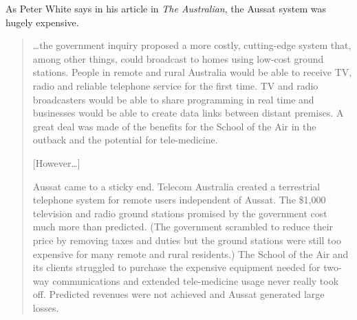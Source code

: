 As Peter White says in his article in \textit{The Australian}, the Aussat system was hugely expensive.

\begin{quotation}
\ldots the government inquiry proposed a more costly, cutting-edge system that, among other things, could broadcast to homes using low-cost ground stations. People in remote and rural Australia would be able to receive TV, radio and reliable telephone service for the first time. TV and radio broadcasters would be able to share programming in real time and businesses would be able to create data links between distant premises. A great deal was made of the benefits for the School of the Air in the outback and the potential for tele-medicine.

[However\ldots]

Aussat came to a sticky end. Telecom Australia created a terrestrial telephone system for remote users independent of Aussat. 
The \$1,000 television and radio ground stations promised by the government cost much more than predicted. (The government scrambled to reduce their price by removing taxes and duties but the ground stations were still too expensive for many remote and rural residents.) The School of the Air and its clients struggled to purchase the expensive equipment needed for two-way communications and extended tele-medicine usage never really took off. Predicted revenues were not achieved and Aussat generated large losses\cite{RefWorks:60}.
\end{quotation}

